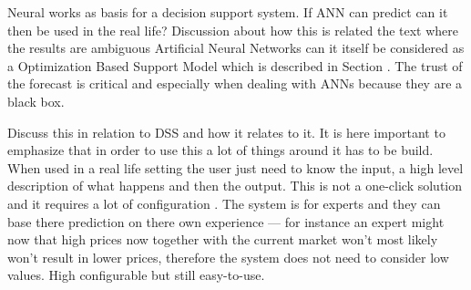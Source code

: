 Neural works as basis for a decision support system. If ANN can predict can it then be used in the real life? Discussion about how this is related the text where the results are ambiguous 
Artificial Neural Networks can it itself be considered as a Optimization Based Support Model which is described in Section . The trust of the forecast is critical and especially when dealing with ANNs because they are a black box. 

Discuss this in relation to DSS and how it relates to it. It is here important to emphasize that in order to use this a lot of things around it has to be build. When used in a real life setting the user just need to know the input, a high level description of what happens and then the output.
This is not a one-click solution and it requires a lot of configuration . The system is for experts and they can base there prediction on there own experience --- for instance an expert might now that high prices now together with the current market won't most likely won't result in lower prices, therefore the system does not need to consider low values. High configurable but still easy-to-use.